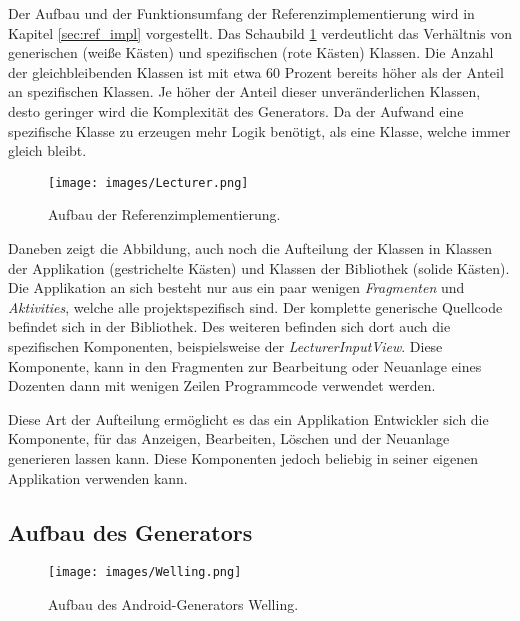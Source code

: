 Der Aufbau und der Funktionsumfang der Referenzimplementierung wird in Kapitel \ref{sec:ref_impl} vorgestellt. Das Schaubild \ref{fig:lecturer_structure} verdeutlicht das Verhältnis von generischen (weiße Kästen) und spezifischen (rote Kästen) Klassen. Die Anzahl der gleichbleibenden Klassen ist mit etwa 60 Prozent bereits höher als der Anteil an spezifischen Klassen. Je höher der Anteil dieser unveränderlichen Klassen, desto geringer wird die Komplexität des Generators. Da der Aufwand eine spezifische Klasse zu erzeugen mehr Logik benötigt, als eine Klasse, welche immer gleich bleibt.

\begin{figure}[H]
	\begin{center}
		\texttt{[image: images/Lecturer.png]}
		\caption{Aufbau der Referenzimplementierung.}
		\label{fig:lecturer_structure}
	\end{center}
\end{figure}

Daneben zeigt die Abbildung, auch noch die Aufteilung der Klassen in Klassen der Applikation (gestrichelte Kästen) und Klassen der Bibliothek (solide Kästen). Die Applikation an sich besteht nur aus ein paar wenigen \textit{Fragmenten} und \textit{Aktivities}, welche alle projektspezifisch sind. Der komplette generische Quellcode befindet sich in der Bibliothek. Des weiteren befinden sich dort auch die spezifischen Komponenten, beispielsweise der \textit{LecturerInputView}. Diese Komponente, kann in den Fragmenten zur Bearbeitung oder Neuanlage eines Dozenten dann mit wenigen Zeilen Programmcode verwendet werden.

Diese Art der Aufteilung ermöglicht es das ein Applikation Entwickler sich die Komponente, für das Anzeigen, Bearbeiten, Löschen und der Neuanlage generieren lassen kann. Diese Komponenten jedoch beliebig in seiner eigenen Applikation verwenden kann.

\subsection{Aufbau des Generators}

\begin{figure}[H]
	\begin{center}
		\texttt{[image: images/Welling.png]}
		\caption{Aufbau des Android-Generators Welling.}
		\label{fig:welling}
	\end{center}
\end{figure}



